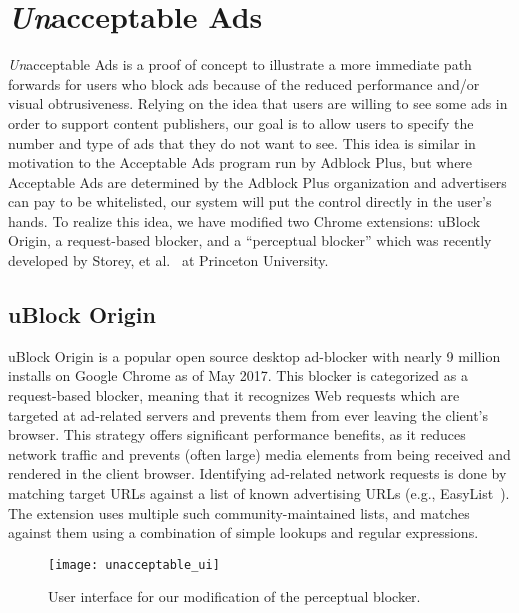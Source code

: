 \section{\textit{Un}acceptable Ads}
\textit{Un}acceptable Ads is a proof of concept to illustrate a more immediate path forwards for users who block ads because of the reduced performance and/or visual obtrusiveness.
Relying on the idea that users are willing to see some ads in order to support content publishers, our goal is to allow users to specify the number and type of ads that they do not want to see.
This idea is similar in motivation to the Acceptable Ads program run by Adblock Plus, but where Acceptable Ads are determined by the Adblock Plus organization and advertisers can pay to be whitelisted, our system will put the control directly in the user's hands.
To realize this idea, we have modified two Chrome extensions: uBlock Origin, a request-based blocker, and a ``perceptual blocker'' which was recently developed by Storey, et al.~\cite{storey2016future} at Princeton University.

\subsection{uBlock Origin}
uBlock Origin is a popular open source desktop ad-blocker with nearly 9 million installs on Google Chrome as of May 2017.
This blocker is categorized as a request-based blocker, meaning that it recognizes Web requests which are targeted at ad-related servers and prevents them from ever leaving the client's browser.
This strategy offers significant performance benefits, as it reduces network traffic and prevents (often large) media elements from being received and rendered in the client browser.
Identifying ad-related network requests is done by matching target URLs against a list of known advertising URLs (e.g., EasyList~\cite{easylist}).
The extension uses multiple such community-maintained lists, and matches against them using a combination of simple lookups and regular expressions.

\begin{figure}[t]
\centering
\texttt{[image: unacceptable\_ui]}
\caption{User interface for our modification of the perceptual blocker.}
\label{fig:unacceptable_ui}
\end{figure}

